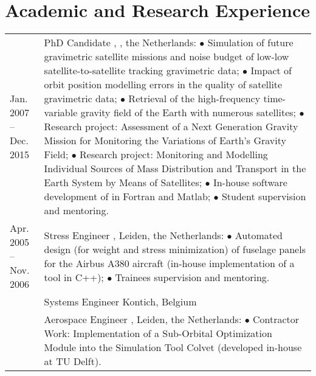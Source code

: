 \documentclass[a4paper]{article}
\newcommand{\dynhref}[2]{%
  \iftoggle{expliciturl}{%
    #2 (\href{#1}{\texttt{\detokenize{#1}}})%
  }{%
    \href{#1}{#2}%
  }%
}
\newcommand{\procv}[2]{\iftoggle{professionalcv}{#1}{#2}}
\newlength{\listskipbig}
\newenvironment{cvsection}[2]{
  \setlength{\floatsep}{0pt}
  \setlength{\textfloatsep}{0pt}
  \setlength{\intextsep}{0pt}
  \section*{#1}
  \begin{longtable}{lp{#2}}
}{
  \end{longtable}
}
\begin{document}
\begin{cvsection}{Academic and Research Experience}{10.8cm}
Jan. 2007 -- Dec. 2015
  & PhD Candidate\newline
    \dynhref{http://tinyurl.com/GRS-TUDelft}{Geoscience \& Remote Sensing}, \dynhref{http://www.tudelft.nl/}{Delft University of Technology}, the Netherlands:\newline
    $\bullet$ Simulation of future gravimetric satellite missions and noise budget of low-low satellite-to-satellite tracking gravimetric data;\newline
    $\bullet$ Impact of orbit position modelling errors in the quality of satellite gravimetric data;\newline
    $\bullet$ Retrieval of the high-frequency time-variable gravity field of the Earth with numerous satellites;\newline
    $\bullet$ Research project: Assessment of a Next Generation Gravity Mission for Monitoring the Variations of Earth's Gravity Field;\newline
    $\bullet$ Research project: Monitoring and Modelling Individual Sources of Mass Distribution and Transport in the Earth System by Means of Satellites;\newline
    $\bullet$ In-house software development of in Fortran and Matlab;\newline
    $\bullet$ Student supervision and mentoring.
    \\[\listskipbig]


Apr. 2005 -- Nov. 2006
  & Stress Engineer\newline
    \dynhref{http://www.globaltechnics.nl/}{Global Technics}, Leiden, the Netherlands:\newline
    $\bullet$ Automated design (for weight and stress minimization) of fuselage panels for the Airbus A380 aircraft (in-house implementation of a tool in C++);\newline
    $\bullet$ Trainees supervision and mentoring.
    \\[\listskipbig]

\procv{
6/2005 -- 7/2005 & Systems Engineer \newline
                 \dynhref{http://www.reduct.net}{Reduct}\newline
                   Kontich, Belgium\\[\listskipbig]
}{}

Oct. 2004 -- Jan. 2005
  & Aerospace Engineer\newline
    \dynhref{http://www.delta-utec.com/}{Delta-Utec}, Leiden, the Netherlands:\newline
      $\bullet$ Contractor Work: Implementation of a Sub-Orbital Optimization Module into the Simulation Tool Colvet (developed in-house at TU Delft).
    \\[\listskipbig]


\end{cvsection}
\end{document}
